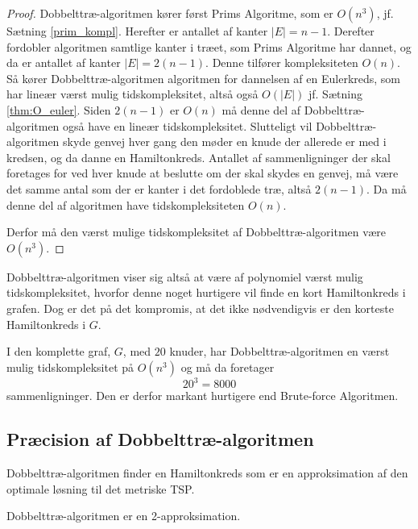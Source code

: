 \begin{proof}
Dobbelttræ-algoritmen kører først Prims Algoritme, som er $O(n^3)$, jf. Sætning \ref{prim_kompl}. 
Herefter er antallet af kanter $|E|=n-1$.
Derefter fordobler algoritmen samtlige kanter i træet, som Prims Algoritme har dannet, og da er antallet af kanter $|E|=2(n-1)$.
	Denne tilfører kompleksiteten $O(n)$.
	Så kører Dobbelttræ-algoritmen algoritmen for dannelsen af en Eulerkreds, som har lineær værst mulig tidskompleksitet, altså også $O(|E|)$ jf. Sætning \ref{thm:O_euler}. 
Siden $2(n-1)$ er $O(n)$ må denne del af Dobbelttræ-algoritmen også have en lineær tidskompleksitet.
Slutteligt vil Dobbelttræ-algoritmen skyde genvej hver gang den møder en knude der allerede er med i kredsen, og da danne en Hamiltonkreds. Antallet af sammenligninger der skal foretages for ved hver knude at beslutte om der skal skydes en genvej, må være det samme antal som der er kanter i det fordoblede træ, altså $2(n-1)$.
	Da må denne del af algoritmen have tidskompleksiteten $O(n)$.

	Derfor må den værst mulige tidskompleksitet af Dobbelttræ-algoritmen være $O(n^3)$.
\end{proof}

Dobbelttræ-algoritmen viser sig altså at være af polynomiel værst mulig tidskompleksitet, hvorfor denne noget hurtigere vil finde en kort Hamiltonkreds i grafen. Dog er det på det kompromis, at det ikke nødvendigvis er den korteste Hamiltonkreds i $G$.

\begin{exmp}
I den komplette graf, $G$, med $20$ knuder, har Dobbelttræ-algoritmen en værst mulig tidskompleksitet på $O(n^3)$ og må da foretager $$20^3 = 8000$$ sammenligninger. Den er derfor markant hurtigere end Brute-force Algoritmen.
\end{exmp}

\subsection{Præcision af Dobbelttræ-algoritmen}
Dobbelttræ-algoritmen finder en Hamiltonkreds som er en approksimation af den optimale løsning til det metriske TSP.

\begin{thm}
Dobbelttræ-algoritmen er en 2-approksimation.
\end{thm}

